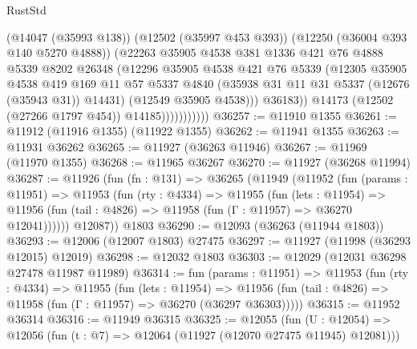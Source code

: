 \begin{lexlean}{RustStd}
\begin{coremodule}
                            (@14047 (@35993 @138))
                            (@12502 (@35997 @453 @393))
                            (@12250 (@36004 @393 @140 @5270 @4888))
                            (@22263
                              @35905
                              @4538
                              @381
                              @1336
                              @421
                              @76
                              @4888
                              @5339
                              @8202
                              @26348
                              (@12296
                                @35905
                                @4538
                                @421
                                @76
                                @5339
                                (@12305
                                  @35905
                                  @4538
                                  @419
                                  @169
                                  @11
                                  @57
                                  @5337
                                  @4840
                                  (@35938 @31 @11 @31 @5337 (@12676 (@35943 @31)) @14431)
                                  (@12549 @35905 @4538)))
                              @36183))
                          @14173
                          (@12502 (@27266 @1797 @454))
                          @14185)))))))))))
@36257 := @11910 @1355
@36261 := @11912 (@11916 @1355) (@11922 @1355)
@36262 := @11941 @1355
@36263 := @11931 @36262
@36265 := @11927 (@36263 @11946)
@36267 := @11969 (@11970 @1355)
@36268 := @11965 @36267
@36270 := @11927 (@36268 @11994)
@36287 := @11926
    (fun (fn : @131) =>
    @36265
      (@11949
        (@11952
          (fun (params : @11951) =>
          @11953
            (fun (rty : @4334) =>
            @11955
              (fun (lets : @11954) =>
              @11956 (fun (tail : @4826) => @11958 (fun (Γ : @11957) => @36270 @12041))))))
        @12087))
    @1803
@36290 := @12093 (@36263 (@11944 @1803))
@36293 := @12006 (@12007 @1803) @27475
@36297 := @11927 (@11998 (@36293 @12015) @12019)
@36298 := @12032 @1803
@36303 := @12029 (@12031 @36298 @27478 @11987 @11989)
@36314 := fun (params : @11951) =>
  @11953
    (fun (rty : @4334) =>
    @11955
      (fun (lets : @11954) =>
      @11956 (fun (tail : @4826) => @11958 (fun (Γ : @11957) => @36270 (@36297 @36303)))))
@36315 := @11952 @36314
@36316 := @11949 @36315
@36325 := @12055
    (fun (U : @12054) => @12056 (fun (t : @7) => @12064 (@11927 (@12070 @27475 @11945) @12081)))

\end{coremodule}
\end{lexlean}
